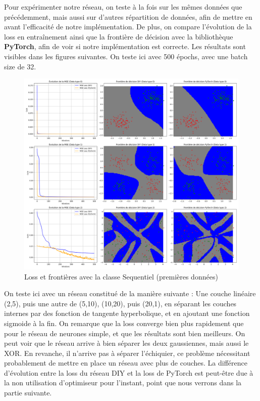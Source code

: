 \documentclass{article}
\begin{document}
Pour expérimenter notre réseau, on teste à la fois sur les mêmes données que précédemment, mais aussi sur d'autres répartition de données, afin de mettre en avant l'efficacité de notre implémentation. De plus, on compare l'évolution de la loss en entraînement ainsi que la frontière de décision avec la bibliothèque \textbf{PyTorch}, afin de voir si notre implémentation est correcte. Les résultats sont visibles dans les figures suivantes. On teste ici avec 500 épochs, avec une batch size de 32.
\begin{figure}[H]
    \centering
    \includegraphics[width=0.8\linewidth]{Images/sequentiel_1.png}
    \caption{Loss et frontières avec la classe Sequentiel (premières données)}
	\label{fig:sequentiel1}
\end{figure}
On teste ici avec un réseau constitué de la manière suivante : Une couche linéaire (2,5), puis une autre de (5,10), (10,20), puis (20,1), en séparant les couches internes par des fonction de tangente hyperbolique, et en ajoutant une fonction sigmoide à la fin.
On remarque que la loss converge bien plus rapidement que pour le réseau de neurones simple, et que les résultats sont bien meilleurs. On peut voir que le réseau arrive à bien séparer les deux gaussiennes, mais aussi le XOR. En revanche, il n'arrive pas à séparer l'échiquier, ce problème nécessitant probablement de mettre en place un réseau avec plus de couches.
La différence d'évolution entre la loss du réseau DIY et la loss de PyTorch est peut-être due à la non utilisation d'optimiseur pour l'instant, point que nous verrons dans la partie suivante.
\end{document}

